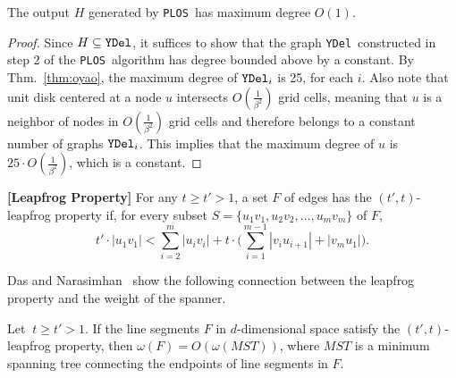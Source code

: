 \documentclass{llncs}
\newcommand{\ABox}{
\raisebox{3pt}{\framebox[6pt]{\rule{6pt}{0pt}}}
}
\newcommand{\palg}{{\tt PLOS}}
\newcommand{\ydel}{{\tt YDel}}
\newcommand{\w}{\omega}
\begin{document}
\begin{theorem}
The output $H$ generated by \palg\ has maximum degree $O(1)$.
\label{thm:pdegree}
\end{theorem}
\begin{proof}
Since $H \subseteq \ydel$, it suffices to show that the graph \ydel\ constructed in step 2 of the \palg\ algorithm
has degree bounded above by a constant.
By Thm.~\ref{thm:oyao}, the maximum degree of $\ydel_i$ is 25, for each $i$. Also note that unit disk centered at a node $u$ intersects $O(\frac{1}{\beta^2})$ grid cells, meaning that $u$ is a neighbor of nodes in $O(\frac{1}{\beta^2})$ grid cells and therefore belongs to a constant number of graphs $\ydel_i$. This implies that the maximum degree of $u$ is $25 \cdot O(\frac{1}{\beta^2})$, which is a constant. \hfill\ABox
\end{proof}

\begin{definition}
{\bf [Leapfrog Property]}
For any $t \ge t' > 1$, a set $F$ of edges has the $(t',t)$-leapfrog property if,
for every subset $S = \{u_1v_1, u_2v_2, \ldots, u_mv_m\}$ of $F$,
\begin{equation}
t' \cdot |u_1 v_1| < \sum_{i=2}^m |u_i v_i| + t \cdot
\Big(\sum_{i=1}^{m-1} |v_i u_{i+1}| + |v_m u_1|\Big).
\label{eq:leapfrog}
\end{equation}
\end{definition}
Das and Narasimhan~\cite{DasNarasimhan97} show the following
connection between the leapfrog property and the weight of the
spanner.
\begin{lemma}
\label{lem:DasNarasimhan}
Let $~t \ge t' > 1$. If the line segments $F$ in $d$-dimensional
space satisfy the $(t', t)$-leapfrog property, then $\w(F) =
O(\w(MST))$, where $MST$ is a minimum spanning tree connecting the
endpoints of line segments in $F$.
\end{lemma}
\end{document}

